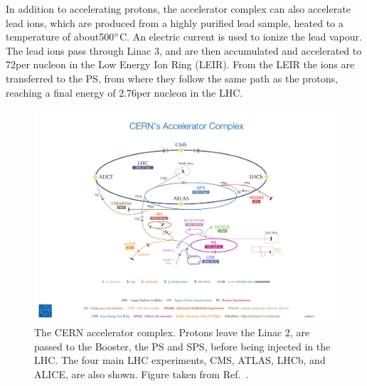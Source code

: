 In addition to accelerating protons, the accelerator complex can also accelerate lead ions, which
are produced from a highly purified lead sample, heated to a temperature of about500$^\circ$C. An
electric current is used to ionize the lead vapour.
The lead ions pass through Linac 3, and are then accumulated and accelerated to 72\MeV per nucleon
in the Low Energy Ion Ring (LEIR). 
From the LEIR the ions are transferred to the PS, from where they follow the same path as the
protons, reaching a final energy of 2.76\TeV per nucleon in the LHC. 

\begin{figure}[t]
  \centering
  \includegraphics[width=\textwidth,clip=true,trim=10cm 0 13cm 9cm]
  {figures/lhc/cern_accelerator_complex_cds1621583}
  \caption{The CERN accelerator complex. Protons leave the Linac 2, are passed to the Booster, the
PS and SPS, before being injected in the LHC. The four main LHC experiments, CMS, ATLAS, LHCb, and
ALICE, are also shown. Figure taken from Ref.~\cite{lhc_complex}.
  \label{fig:lhc_complex}}
\end{figure}

